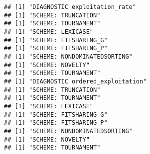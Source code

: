 \documentclass[]{book}
\newenvironment{Shaded}{\begin{snugshade}}{\end{snugshade}}
\newcommand{\CharTok}[1]{\textcolor[rgb]{0.31,0.60,0.02}{#1}}
\newcommand{\CommentTok}[1]{\textcolor[rgb]{0.56,0.35,0.01}{\textit{#1}}}
\newcommand{\ControlFlowTok}[1]{\textcolor[rgb]{0.13,0.29,0.53}{\textbf{#1}}}
\newcommand{\DataTypeTok}[1]{\textcolor[rgb]{0.13,0.29,0.53}{#1}}
\newcommand{\DecValTok}[1]{\textcolor[rgb]{0.00,0.00,0.81}{#1}}
\newcommand{\KeywordTok}[1]{\textcolor[rgb]{0.13,0.29,0.53}{\textbf{#1}}}
\newcommand{\NormalTok}[1]{#1}
\newcommand{\OperatorTok}[1]{\textcolor[rgb]{0.81,0.36,0.00}{\textbf{#1}}}
\newcommand{\OtherTok}[1]{\textcolor[rgb]{0.56,0.35,0.01}{#1}}
\newcommand{\StringTok}[1]{\textcolor[rgb]{0.31,0.60,0.02}{#1}}
\begin{document}
\begin{Shaded}
\end{Shaded}

\begin{verbatim}
## [1] "DIAGNOSTIC exploitation_rate"
## [1] "SCHEME: TRUNCATION"
## [1] "SCHEME: TOURNAMENT"
## [1] "SCHEME: LEXICASE"
## [1] "SCHEME: FITSHARING_G"
## [1] "SCHEME: FITSHARING_P"
## [1] "SCHEME: NONDOMINATEDSORTING"
## [1] "SCHEME: NOVELTY"
## [1] "SCHEME: TOURNAMENT"
## [1] "DIAGNOSTIC ordered_exploitation"
## [1] "SCHEME: TRUNCATION"
## [1] "SCHEME: TOURNAMENT"
## [1] "SCHEME: LEXICASE"
## [1] "SCHEME: FITSHARING_G"
## [1] "SCHEME: FITSHARING_P"
## [1] "SCHEME: NONDOMINATEDSORTING"
## [1] "SCHEME: NOVELTY"
## [1] "SCHEME: TOURNAMENT"
\end{verbatim}
\end{document}
